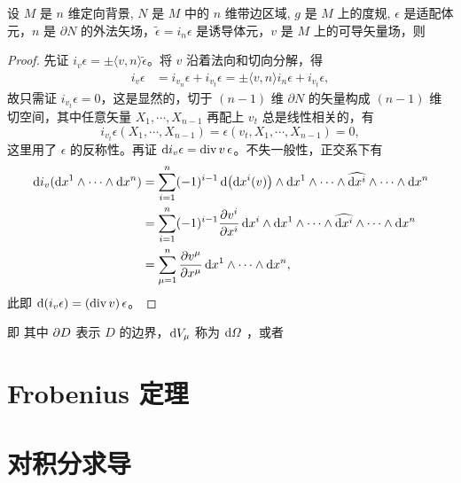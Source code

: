 \begin{theorem}[Gauss]
    设 $M$ 是 $n$ 维定向背景, $N$ 是 $M$ 中的 $n$ 维带边区域, $g$ 是 $M$ 上的度规, $\epsilon$ 是适配体元，$n$ 是 $\partial N$ 的外法矢场，$\tilde\epsilon=i_n \epsilon$ 是诱导体元，$v$ 是 $M$ 上的可导矢量场，则
\end{theorem}
\begin{proof}
    先证 $i_v\epsilon=\pm\langle v,n\rangle \tilde\epsilon$。将 $v$ 沿着法向和切向分解，得
    \begin{align*}
        i_v\epsilon&=i_{v_n}\epsilon+i_{v_t}\epsilon=\pm\langle v,n\rangle i_{n}\epsilon+i_{v_t}\epsilon,
    \end{align*}
    故只需证 $i_{v_t}\epsilon=0$，这是显然的，切于 $(n-1)$ 维 $\partial N$ 的矢量构成 $(n-1)$ 维切空间，其中任意矢量 $X_1,\cdots,X_{n-1}$ 再配上 $v_t$ 总是线性相关的，有
    \[
    i_{v_t}\epsilon(X_1,\cdots,X_{n-1})=\epsilon(v_t,X_1,\cdots,X_{n-1})=0,
    \]
    这里用了 $\epsilon$ 的反称性。再证 $\dd i_v\epsilon=\operatorname{div} v\,\epsilon$。不失一般性，正交系下有
    \begin{align*}
        \dd i_v(\dd x^1\wedge\cdots\wedge\dd x^n)&= \sum_{i=1}^n (-1)^{i-1} \dd(\dd x^i(v))\wedge\dd x^1 \wedge \cdots \wedge \widehat{\dd x^i}\wedge \cdots \wedge \dd x^n\\
        &=\sum_{i=1}^n (-1)^{i-1} \pdv{v^i}{x^i}\,\dd x^i\wedge\dd x^1 \wedge \cdots \wedge \widehat{\dd x^i}\wedge \cdots \wedge \dd x^n\\
        &=\sum_{\mu=1}^n\pdv{v^\mu}{x^\mu}\,\dd x^1\wedge\cdots\wedge\dd x^n,
    \end{align*}
    此即 $\dd(i_v\epsilon)=(\operatorname{div} v)\,\epsilon$。
\end{proof}


即
其中 $\partial D$ 表示 $D$ 的边界，$\dd V_\mu$ 称为 $\dd{\Omega}$ ，或者


\section{Frobenius 定理}

\section{对积分求导}

